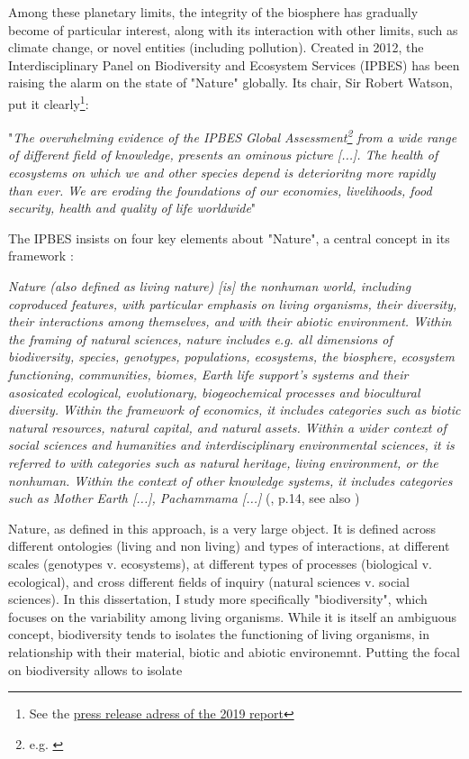 Among these planetary limits, the integrity of the biosphere has gradually become of particular interest, along with its interaction with other limits, such as climate change, or novel entities (including pollution). Created in 2012, the Interdisciplinary Panel on Biodiversity and Ecosystem Services (IPBES) has been raising the alarm on the state of "Nature" globally. Its chair, Sir Robert Watson, put it clearly\footnote{See the \href{https://www.ipbes.net/news/Media-Release-Global-Assessment}{press release adress of the 2019 report}}:
\begin{displayquote}
"\textit{The overwhelming evidence of the IPBES Global Assessment\footnote{e.g. \cite{ipbes_2022_6417333}} from a wide range of different field of knowledge, presents an ominous picture [...]. The health of ecosystems on which we and other species depend is deterioritng more rapidly than ever. We are eroding the foundations of our economies, livelihoods, food security, health and quality of life worldwide}"
\end{displayquote}

The IPBES insists on four key elements about "Nature", a central concept in its framework \citep{ipbes_2022_6417333}:

\begin{displayquote}
\textit{Nature (also defined as living nature) [is] the nonhuman world, including coproduced features, with particular emphasis on living organisms, their diversity, their interactions among themselves, and with their abiotic environment. Within the framing of natural sciences, nature includes e.g. all dimensions of biodiversity, species, genotypes, populations, ecosystems, the biosphere, ecosystem functioning, communities, biomes, Earth life support's systems and their asosicated ecological, evolutionary, biogeochemical processes and biocultural diversity. Within the framework of economics, it includes categories such as biotic natural resources, natural capital, and natural assets. Within a wider context of social sciences and humanities and interdisciplinary environmental sciences, it is referred to with categories such as natural heritage, living environment, or the nonhuman. Within the context of other knowledge systems, it includes categories such as Mother Earth [...], Pachammama [...]} (\cite{ipbes_2022_6417333}, p.14, see also \cite{DIAZ20151})
\end{displayquote}


Nature, as defined in this approach, is a very large object. It is defined across different ontologies (living and non living) and types of interactions, at different scales (genotypes v. ecosystems), at different types of processes (biological v. ecological), and cross different fields of inquiry (natural sciences v. social sciences). 
In this dissertation, I study more specifically "biodiversity", which focuses on the variability among living organisms. While it is itself an ambiguous concept, biodiversity tends to isolates the functioning of living organisms, in relationship with their material, biotic and abiotic environemnt. Putting the focal on biodiversity allows to isolate 

